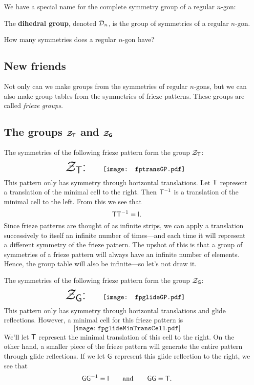 \documentclass{ximera}
\begin{document}
We have a special name for the complete symmetry group of a regular
$n$-gon:

\begin{dfn} The \textbf{dihedral group}, denoted $\mathcal D_n$, is the group of symmetries of a regular
  $n$-gon.
\end{dfn}

\begin{question}
How many symmetries does a regular $n$-gon have?
\end{question}





\subsection{New friends}


Not only can we make groups from the symmetries of regular $n$-gons,
but we can also make group tables from the symmetries of frieze
patterns. These groups are called \textit{frieze groups}.


\subsection{The groups $\boldsymbol{\mathcal{Z}_\mathsf{T}}$ and $\boldsymbol{\mathcal{Z}_\mathsf{G}}$}

The symmetries of the following frieze pattern form the group $\mathcal{Z}_\mathsf{T}$:
\[
\text{\huge $\Zt$:}\qquad\begin{array}{c}
\texttt{[image: fptransGP.pdf]}
\end{array}
\]
This pattern only has symmetry through horizontal translations. Let
$\mathsf{T}$ represent a translation of the minimal cell to the
right. Then $\mathsf{T}^{-1}$ is a translation of the minimal cell to the
left. From this we see that
\[
\mathsf{T}\mathsf{T}^{-1} = \mathsf{I}.
\]
Since frieze patterns are thought of as infinite strips, we can apply
a translation successively to itself an infinite number of times---and
each time it will represent a different symmetry of the frieze
pattern. The upshot of this is that a group of symmetries of a frieze
pattern will always have an infinite number of elements. Hence, the
group table will also be infinite---so let's not draw it.


The symmetries of the following frieze pattern form the group $\mathcal{Z}_\mathsf{G}$:
\[
\text{\huge $\Zg$:}\qquad\begin{array}{c}
\texttt{[image: fpglideGP.pdf]}
\end{array}
\]
This pattern only has symmetry through horizontal translations and
glide reflections. However, a minimal cell for this frieze pattern is
\[
\texttt{[image: fpglideMinTransCell.pdf]}
\]
We'll let $\mathsf{T}$ represent the minimal translation of this cell to the
right. On the other hand, a smaller piece of the frieze pattern will
generate the entire pattern through glide reflections.  If we let
$\mathsf{G}$ represent this glide reflection to the right, we see that
\[
\mathsf{G}\mathsf{G}^{-1} = \mathsf{I} \qquad\text{and}\qquad\mathsf{G}\mathsf{G} = \mathsf{T}.
\]
\end{document}
